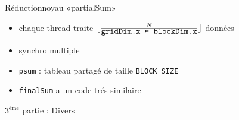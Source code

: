 \documentclass[11pt,mathserif]{beamer}
\begin{document}
\begin{frame}{Réduction}{noyau «partialSum»}
\pause
  
\pause
  \begin{itemize}[<+->]
    \item chaque thread traite $\lfloor \frac{N}{\mbox{{\tt gridDim.x * blockDim.x}}}\rfloor $ données
    \item synchro multiple
    \item {\tt psum} : tableau partagé de taille {\tt BLOCK\_SIZE }
    \item {\tt finalSum} a un code trés similaire
  \end{itemize}
\end{frame}

\begin{frame}
  \begin{center}
    {\Huge $3^{\mbox{ème}}$ partie : Divers }
  \end{center}
\end{frame}
\end{document}

